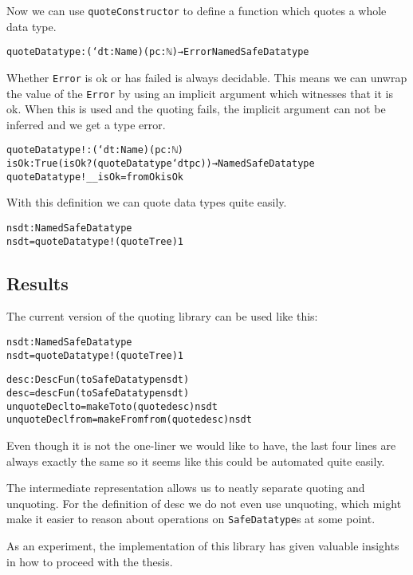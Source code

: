 Now we can use \texttt{quoteConstructor} to define a function which quotes
a whole data type.

\begin{alltt}
quoteDatatype : (`dt : Name)(pc : ℕ) → Error NamedSafeDatatype
\end{alltt}

Whether \texttt{Error} is ok or has failed is always decidable.
This means we can unwrap the value of the \texttt{Error} by using an
implicit argument which witnesses that it is ok.
When this is used and the quoting fails, the implicit argument can not
be inferred and we get a type error.

\begin{alltt}
quoteDatatype! : (`dt : Name) (pc : ℕ)
  {isOk : True (isOk? (quoteDatatype `dt pc))} → NamedSafeDatatype
quoteDatatype! _ _ {isOk} = fromOk isOk
\end{alltt}

With this definition we can quote data types quite easily.

\begin{alltt}
nsdt : NamedSafeDatatype
nsdt = quoteDatatype! (quote Tree) 1
\end{alltt}

\subsection{Results}\label{sec:prototype-results}

The current version of the quoting library can be used like this:

\begin{alltt}
nsdt : NamedSafeDatatype
nsdt = quoteDatatype! (quote Tree) 1

desc : DescFun (toSafeDatatype nsdt)
desc = descFun (toSafeDatatype nsdt)
unquoteDecl to = makeTo to (quote desc) nsdt
unquoteDecl from = makeFrom from (quote desc) nsdt
\end{alltt}

Even though it is not the one-liner we would like to have, the last
four lines are always exactly the same so it seems like this could be
automated quite easily.

The intermediate representation allows us to neatly separate quoting
and unquoting.
For the definition of desc we do not even use unquoting, which might
make it easier to reason about operations on \texttt{SafeDatatype}s at
some point. 

As an experiment, the implementation of this library has given
valuable insights in how to proceed with the thesis.
